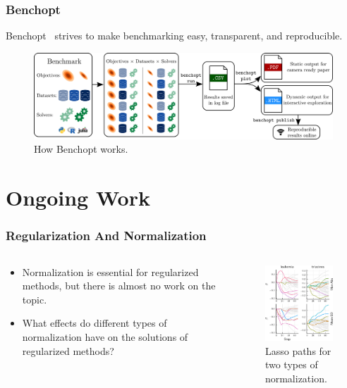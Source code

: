 \documentclass[10pt,aspectratio=169]{beamer}
\begin{document}
\begin{frame}[c]
  \frametitle{Benchopt}

  Benchopt~\parencite{moreau2022a} strives to make benchmarking easy, transparent, and reproducible.

  \begin{figure}[htpb]
    \centering
    \includegraphics[width=\textwidth]{figures/benchopt_schema.pdf}
    \caption{%
      How Benchopt works.
    }
  \end{figure}
\end{frame}

\section{Ongoing Work}

\begin{frame}[c]
  \frametitle{Regularization And Normalization}
  \begin{columns}
    \begin{column}{0.45\textwidth}
      \begin{itemize}
        \item Normalization is essential for regularized methods, but there is almost no work on the topic.
        \item What effects do different types of normalization have on the solutions of regularized methods?
      \end{itemize}
    \end{column}
    \begin{column}{0.45\textwidth}
      \begin{figure}[htpb]
        \centering
        \includegraphics[width=5.5cm]{figures/realdata_paths.pdf}
        \caption{%
          Lasso paths for two types of normalization.
        }
      \end{figure}
    \end{column}
  \end{columns}
\end{frame}
\end{document}

